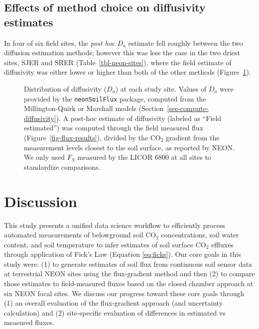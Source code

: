 \documentclass[
  letterpaper,
  DIV=11,
  numbers=noendperiod]{scrartcl}
\begin{document}
\subsection{Effects of method choice on diffusivity
estimates}\label{effects-of-method-choice-on-diffusivity-estimates}

In four of six field sites, the \emph{post hoc} \(D_{a}\) estimate fell
roughly between the two diffusion estimation methods; however this was
less the case in the two driest sites, SJER and SRER
(Table~\ref{tbl-neon-sites}), where the field estimate of diffusivity
was either lower or higher than both of the other methods
(Figure~\ref{fig-diffusivity-plot}).

\begin{figure}


\caption{\label{fig-diffusivity-plot}Distribution of diffusivity
(\(D_{a}\)) at each study site. Values of \(D_{a}\) were provided by the
\texttt{neonSoilFlux} package, computed from the Millington-Quirk or
Marshall models (Section~\ref{sec-compute-diffusivity}). A post-hoc
estimate of diffusivity (labeled as ``Field estimated'') was computed
through the field measured flux (Figure~\ref{fig-flux-results}), divided
by the CO\(_{2}\) gradient from the measurement levels closest to the
soil surface, as reported by NEON. We only used \(F_{S}\) measured by
the LICOR 6800 at all sites to standardize comparisons.}

\end{figure}%

\section{Discussion}\label{sec-discussion}

This study presents a unified data science workflow to efficiently
process automated measurements of belowground soil CO\(_{2}\)
concentrations, soil water content, and soil temperature to infer
estimates of soil surface CO\(_{2}\) effluxes through application of
Fick's Law (Equation \ref{eq:ficks}). Our core goals in this study were:
(1) to generate estimates of soil flux from continuous soil sensor data
at terrestrial NEON sites using the flux-gradient method and then (2) to
compare those estimates to field-measured fluxes based on the closed
chamber approach at six NEON focal sites. We discuss our progress toward
these core goals through (1) an overall evaluation of the flux-gradient
approach (and uncertainty calculation) and (2) site-specific evaluation
of differences in estimated vs measured fluxes.
\end{document}
